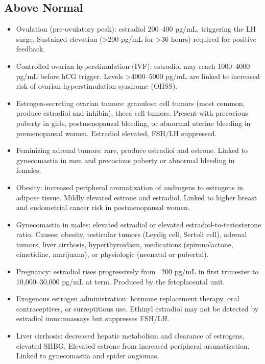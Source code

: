 \subsection*{Above Normal}
\begin{itemize}
  \item Ovulation (pre-ovulatory peak): estradiol 200--400 pg/mL, triggering the LH surge. Sustained elevation (>200 pg/mL for >36 hours) required for positive feedback.
  \item Controlled ovarian hyperstimulation (IVF): estradiol may reach 1000--4000 pg/mL before hCG trigger. Levels >4000--5000 pg/mL are linked to increased risk of ovarian hyperstimulation syndrome (OHSS).
  \item Estrogen-secreting ovarian tumors: granulosa cell tumors (most common, produce estradiol and inhibin), theca cell tumors. Present with precocious puberty in girls, postmenopausal bleeding, or abnormal uterine bleeding in premenopausal women. Estradiol elevated, FSH/LH suppressed.
  \item Feminizing adrenal tumors: rare, produce estradiol and estrone. Linked to gynecomastia in men and precocious puberty or abnormal bleeding in females.
  \item Obesity: increased peripheral aromatization of androgens to estrogens in adipose tissue. Mildly elevated estrone and estradiol. Linked to higher breast and endometrial cancer risk in postmenopausal women.
  \item Gynecomastia in males: elevated estradiol or elevated estradiol-to-testosterone ratio. Causes: obesity, testicular tumors (Leydig cell, Sertoli cell), adrenal tumors, liver cirrhosis, hyperthyroidism, medications (spironolactone, cimetidine, marijuana), or physiologic (neonatal or pubertal).
  \item Pregnancy: estradiol rises progressively from ~200 pg/mL in first trimester to 10,000--30,000 pg/mL at term. Produced by the fetoplacental unit.
  \item Exogenous estrogen administration: hormone replacement therapy, oral contraceptives, or surreptitious use. Ethinyl estradiol may not be detected by estradiol immunoassays but suppresses FSH/LH.
  \item Liver cirrhosis: decreased hepatic metabolism and clearance of estrogens, elevated SHBG. Elevated estrone from increased peripheral aromatization. Linked to gynecomastia and spider angiomas.
\end{itemize}

